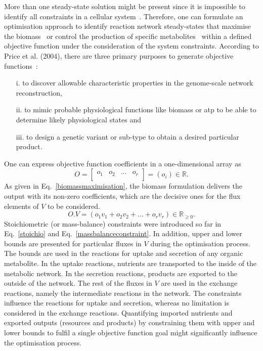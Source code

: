 More than one steady-state solution might be present since it is impossible to identify all constraints in a cellular system~\cite{KAUFFMAN2003491}. Therefore, one can formulate an optimisation approach to identify reaction network steady-states that maximise the biomass~\cite{KAUFFMAN2003491,PRICE2004} or control the production of specific metabolites~\cite{VARMA1993} within a defined objective function under the consideration of the system constraints. According to Price et al. (2004),
there are three primary purposes to generate objective functions~\cite{PRICE2004}:
\begin{itemize}
	\item[i.] to discover allowable characteristic properties in the genome-scale network reconstruction,
	\item[ii.] to mimic probable physiological functions like biomass or \acs{atp} to be able to determine likely physiological states and
	\item[iii.] to design a genetic variant or sub-type to obtain a desired particular product.
\end{itemize}

One can express objective function coefficients in a one-dimensional array as
\begin{equation} %
	O =  \begin{bmatrix}
		o_{1} & o_{2} & \dots  & o_{r}\\
	\end{bmatrix}=(o_{i})\in \mathbb{R}.
	\label{objectivecoefficients}
\end{equation}
As given in Eq.~\eqref{biomassmaximisation}, the biomass formulation delivers the output with its non-zero coefficients, which are the decisive ones for the flux elements of $V$ to be considered.
\begin{equation} %
	O.V = (o_{1}v_{1} + o_{2}v_{2} + \dots + o_{r}v_{r})\in \mathbb{R}_{\ge0}.
	\label{biomassmaximisation}
\end{equation}
Stoichiometric (or mass-balance) constraints were introduced so far in Eq.~\eqref{stoichio} and Eq.~\eqref{massbalanceconstraint}. In addition, upper and lower bounds are presented for particular fluxes in $V$ during the optimisation process. The bounds are used in the reactions for uptake and secretion of any organic metabolite. In the uptake reactions, nutrients are transported to the inside of the metabolic network. In the secretion reactions, products are exported to the outside of the network. The rest of the fluxes in $V$ are used in the exchange reactions, namely the intermediate reactions in the network. The constraints influence the reactions for uptake and secretion, whereas no limitation is considered in the exchange reactions. Quantifying imported nutrients and exported outputs (resources and products) by constraining them with upper and lower bounds to fulfil a single objective function goal might significantly influence the optimisation process.

